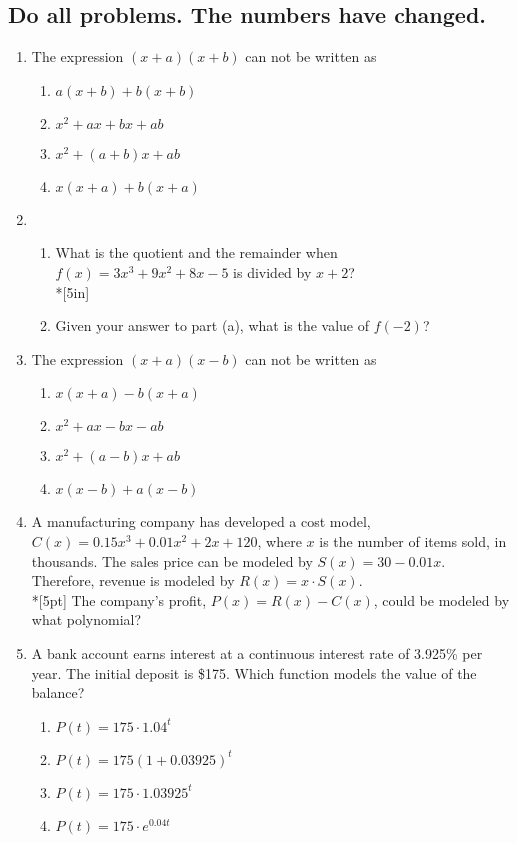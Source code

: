 \documentclass[12pt, oneside]{article}
\begin{document}
\subsection*{Do all problems. The numbers have changed.}
\vspace{1cm}

\begin{enumerate}

\item The expression $(x + a)(x + b)$ can not be written as
\begin{enumerate}
    \item $a(x + b)+ b(x + b)$
    \item $x^2 + ax + bx + ab$ 
    \item  $x^2 + (a + b)x + ab$  
    \item $x(x + a)+ b(x + a)$
\end{enumerate}

\item 
\begin{enumerate}
    \item What is the quotient and the remainder when $f(x)=3x^3+9x^2+8x-5$ is divided by $x+2$?\\*[5in]
    \item Given your answer to part (a), what is the value of $f(-2)$?
\end{enumerate}


\newpage
\item The expression $(x + a)(x - b)$ can not be written as
\begin{enumerate}
    \item $x(x + a)- b(x + a)$
    \item $x^2 + ax - bx - ab$ 
    \item  $x^2 + (a - b)x + ab$  
    \item $x(x - b)+ a(x - b)$
\end{enumerate}

\item A manufacturing company has developed a cost model, $C(x)=0.15x^3+0.01x^2+2x+120$, where $x$ is the number of items sold, in thousands. The sales price can be modeled by $S(x)=30-0.01x$. Therefore, revenue is modeled by $R(x)=x \cdot S(x)$.\\*[5pt]
The company’s profit, $P(x)=R(x)-C(x)$, could be modeled by what polynomial?  %

\newpage

\item A bank account earns interest at a continuous interest rate of 3.925\% per year. The initial deposit is \$175. Which function models the value of the balance?
\begin{enumerate}
    \item $P(t)=175 \cdot 1.04^{t}$
    \item $P(t)=175 (1+0.03925)^{t}$
    \item $P(t)=175 \cdot 1.03925^{t}$
    \item $P(t)=175 \cdot e^{0.04t}$
\end{enumerate}


\end{enumerate}
\end{document}
